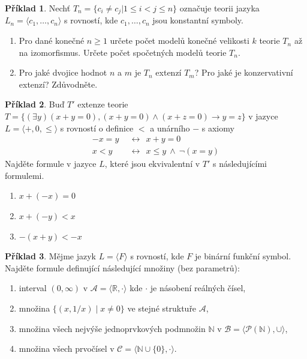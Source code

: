 \documentclass[a4paper]{article}
\theoremstyle{definition}
\newtheorem{problem}{Příklad}
\begin{document}
\medskip\begin{problem}
Nechť $T_n = \{c_i \neq c_j | 1 \leq i < j \leq n\}$ označuje teorii jazyka $L_n = \langle c_1, \dots, c_n \rangle$ s rovností, kde $c_1, \dots, c_n$ jsou konstantní symboly.
\begin{enumerate}[label=(\alph*),noitemsep,topsep=6pt]
    
    \item Pro dané konečné $n \geq 1$ určete počet modelů konečné velikosti $k$ teorie $T_n$ až na izomorfismus. Určete počet spočetných modelů teorie $T_n$. 
    \item Pro jaké dvojice hodnot $n$ a $m$ je $T_n$ extenzí $T_m$? Pro jaké je konzervativní extenzí? Zdůvodněte.
\end{enumerate}
\end{problem}


\medskip\begin{problem}
Buď $T'$ extenze teorie $T=\{(\exists y)(x+y=0),(x+y=0)\wedge (x+z=0)\rightarrow y=z\}$ v jazyce $L=\langle +,0,\le\rangle$ s rovností o definice $<$ a unárního $-$ s axiomy
\begin{align*}
    -x=y\ \ &\leftrightarrow\ \ x+y=0\\
    x<y\ \ &\leftrightarrow\ \ x\le y\ \wedge\ \neg(x=y)
\end{align*}
Najděte formule v jazyce $L$, které jsou ekvivalentní v $T'$ s následujícími formulemi.
\begin{enumerate}[label=(\alph*),noitemsep,topsep=6pt]
    
    \item $x+(-x)=0$
    \item $x+(-y)<x$
    \item $-(x+y)<-x$
\end{enumerate}
\end{problem}


\medskip\begin{problem}
Mějme jazyk $L=\langle F \rangle$ s rovností, kde $F$ je binární funkční symbol. Najděte formule definující následující množiny (bez parametrů):
\begin{enumerate}[label=(\alph*),noitemsep,topsep=6pt]
    
    \item interval $(0,\infty)$ v $\mathcal A=\langle\mathbb R, \cdot\rangle$ kde $\cdot$ je násobení reálných čísel,
    \item množina $\{(x, 1/x)\mid x\neq 0\}$ ve stejné struktuře $\mathcal A$,
    \item množina všech nejvýše jednoprvkových podmnožin $\mathbb N$ v $\mathcal B=\langle\mathcal P(\mathbb N),\cup\rangle$,
    \item množina všech prvočísel v $\mathcal C=\langle \mathbb N\cup\{0\}, \cdot\rangle$.
\end{enumerate}
\end{problem}
\end{document}
